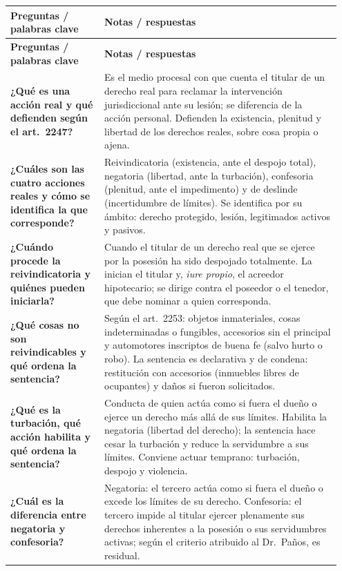 \documentclass[12pt,oneside]{book}
\makeatletter
\newenvironment{cornell}{%
    \par\vspace{0.5em}
    \noindent
    \begin{longtable}{@{}>{\raggedright\arraybackslash}p{0.27\linewidth}
                         >{\raggedright\arraybackslash}p{0.68\linewidth}@{}}
    \toprule
    \textbf{Preguntas / palabras clave} & \textbf{Notas / respuestas} \\
    \midrule
    \endfirsthead
    \toprule
    \textbf{Preguntas / palabras clave} & \textbf{Notas / respuestas} \\
    \midrule
    \endhead
}{%
    \bottomrule
    \end{longtable}
}
\makeatother
\begin{document}
\begin{cornell}
\textbf{¿Qué es una acción real y qué defienden según el art.~2247?} &
Es el medio procesal con que cuenta el titular de un derecho real para reclamar la intervención jurisdiccional ante su lesión; se diferencia de la acción personal. Defienden la existencia, plenitud y libertad de los derechos reales, sobre cosa propia o ajena. \\

\textbf{¿Cuáles son las cuatro acciones reales y cómo se identifica la que corresponde?} &
Reivindicatoria (existencia, ante el despojo total), negatoria (libertad, ante la turbación), confesoria (plenitud, ante el impedimento) y de deslinde (incertidumbre de límites). Se identifica por su ámbito: derecho protegido, lesión, legitimados activos y pasivos. \\

\textbf{¿Cuándo procede la reivindicatoria y quiénes pueden iniciarla?} &
Cuando el titular de un derecho real que se ejerce por la posesión ha sido despojado totalmente. La inician el titular y, \textit{iure propio}, el acreedor hipotecario; se dirige contra el poseedor o el tenedor, que debe nominar a quien corresponda. \\

\textbf{¿Qué cosas no son reivindicables y qué ordena la sentencia?} &
Según el art.~2253: objetos inmateriales, cosas indeterminadas o fungibles, accesorios sin el principal y automotores inscriptos de buena fe (salvo hurto o robo). La sentencia es declarativa y de condena: restitución con accesorios (inmuebles libres de ocupantes) y daños si fueron solicitados. \\

\textbf{¿Qué es la turbación, qué acción habilita y qué ordena la sentencia?} &
Conducta de quien actúa como si fuera el dueño o ejerce un derecho más allá de sus límites. Habilita la negatoria (libertad del derecho); la sentencia hace cesar la turbación y reduce la servidumbre a sus límites. Conviene actuar temprano: turbación, despojo y violencia. \\

\textbf{¿Cuál es la diferencia entre negatoria y confesoria?} &
Negatoria: el tercero actúa como si fuera el dueño o excede los límites de su derecho. Confesoria: el tercero impide al titular ejercer plenamente sus derechos inherentes a la posesión o sus servidumbres activas; según el criterio atribuido al Dr.~Paños, es residual. \\


\end{cornell}
\end{document}
